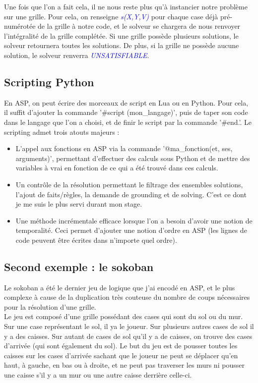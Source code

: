 \documentclass[12pt,a4paper]{article}
\begin{document}
Une fois que l'on a fait cela, il ne nous reste plus qu'à instancier notre problème sur une grille. Pour cela, on renseigne \emph{\textcolor{blue}{s(X,Y,V)}} pour chaque case déjà pré-numérotée de la grille à notre code, et le solveur se chargera 
de nous renvoyer l'intégralité de la grille complétée. Si une grille possède plusieurs solutions, le solveur retournera toutes les solutions. De plus, si la grille ne possède aucune solution, le solveur renverra 
\emph{\textcolor{blue}{UNSATISFIABLE}}.

\subsection{Scripting Python}
En ASP, on peut écrire des morceaux de script en Lua ou en Python. Pour cela, il suffit d'ajouter la commande '\#script (mon\_langage)', puis de taper son code dans le langage que l'on a choisi, et de finir le script par la 
commande '\#end.'. Le scripting admet trois atouts majeurs :
\begin{itemize}
	\item L'appel aux fonctions en ASP via la commande '@ma\_fonction(et, ses, arguments)', permettant d'effectuer des calculs sous Python et de mettre des variables à vrai en fonction de ce qui a été trouvé dans ces 
	calculs.
	\item Un contrôle de la résolution permettant le filtrage des ensembles solutions, l'ajout de faits/règles, la demande de grounding et de solving. C'est ce dont je me suis le plus servi durant mon stage.
	\item Une méthode incrémentale efficace lorsque l'on a besoin d'avoir une notion de temporalité. Ceci permet d'ajouter une notion d'ordre en ASP (les lignes de code peuvent être écrites dans n'importe quel ordre).
\end{itemize}

\subsection{Second exemple : le sokoban}
Le sokoban a été le dernier jeu de logique que j'ai encodé en ASP, et le plus complexe à cause de la duplication très couteuse du nombre de coups nécessaires pour la résolution d'une grille.\\

Le jeu est composé d'une grille possédant des cases qui sont du sol ou du mur. Sur une case représentant le sol, il ya le joueur. Sur plusieurs autres cases de sol il y a des caisses. Sur autant de cases de sol qu'il y a de caisses, 
on trouve des cases d'arrivée (qui sont également du sol). Le but du jeu est de pousser toutes les caisses sur les cases d'arrivée sachant que le joueur ne peut se déplacer qu'en haut, à gauche, en bas ou à droite, et ne peut pas 
traverser les murs ni pousser une caisse s'il y a un mur ou une autre caisse derrière celle-ci.\\ \\
\end{document}

